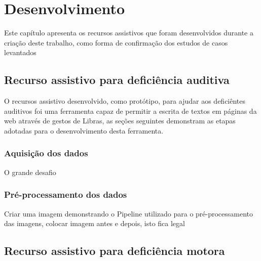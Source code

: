 \newpage
\chapter{Desenvolvimento}
\label{ch:desenvolvimento}


Este capítulo apresenta os recursos assistivos que foram desenvolvidos durante a criação deste trabalho, como forma de confirmação dos estudos de casos levantados 


\section{Recurso assistivo para deficiência auditiva}

O recursos assistivo desenvolvido, como protótipo, para ajudar aos deficiêntes auditivos foi uma ferramenta capaz de permitir a escrita de textos em páginas da web através de gestos de Libras, as seções seguintes demonstram as etapas adotadas para o desenvolvimento desta ferramenta.

\subsection{Aquisição dos dados}

O grande desafio 

\subsection{Pré-processamento dos dados} 



\par Criar uma imagem demonstrando o Pipeline utilizado para o pré-processamento das imagens, colocar imagem antes e depois, isto fica legal

\section{Recurso assistivo para deficiência motora}
